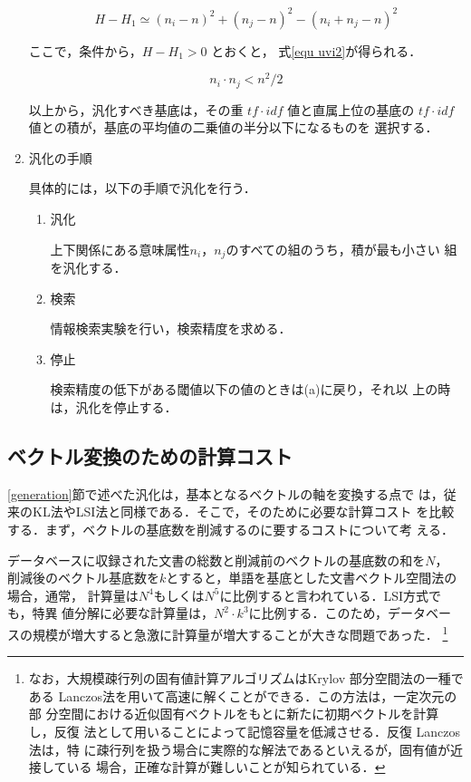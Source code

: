 \begin{enumerate}
\begin{equation}
\label{equ uvi1}
  H - H_1  \simeq (n_i-n)^2 +(n_j-n)^2 -(n_i+n_j-n)^2
\end{equation}

ここで，条件から，$ H - H_1 > 0 $ とおくと，
式\ref{equ uvi2}が得られる．

\begin{equation}
\label{equ uvi2}
     n_i \cdot n_j < n ^2 / 2
\end{equation}

以上から，汎化すべき基底は，その重 $tf \cdot idf$ 値と直属上位の基底の 
$tf \cdot idf$ 値との積が，基底の平均値の二乗値の半分以下になるものを
選択する．

\item 汎化の手順

具体的には，以下の手順で汎化を行う．

\begin{enumerate}

\item 汎化 
\label{itemitem1}

上下関係にある意味属性$ n_i$，$n_j$のすべての組のうち，積が最も小さい
組を汎化する．

\item  検索

情報検索実験を行い，検索精度を求める．

\item 停止

検索精度の低下がある閾値以下の値のときは(a)に戻り，それ以
上の時は，汎化を停止する．

\end{enumerate}


\end{enumerate}

\subsection{ベクトル変換のための計算コスト}

\ref{generation}節で述べた汎化は，基本となるベクトルの軸を変換する点で
は，従来のKL法やLSI法と同様である．そこで，そのために必要な計算コスト
を比較する．まず，ベクトルの基底数を削減するのに要するコストについて考
える．

データベースに収録された文書の総数と削減前のベクトルの基底数の和を$N$，
削減後のベクトル基底数を$k$とすると，単語を基底とした文書ベクトル空間法の場合，通常，
計算量は$N^4$もしくは$N^5$に比例すると言われている．LSI方式でも，特異
値分解に必要な計算量は，$N^2 \cdot k^3$に比例する．このため，データベー
スの規模が増大すると急激に計算量が増大することが大きな問題であった．
\footnote{
なお，大規模疎行列の固有値計算アルゴリズムはKrylov 部分空間法の一種で
ある Lanczos法を用いて高速に解くことができる．この方法は，一定次元の部
分空間における近似固有ベクトルをもとに新たに初期ベクトルを計算し，反復
法として用いることによって記憶容量を低減させる．反復 Lanczos法は，特
に疎行列を扱う場合に実際的な解法であるといえるが，固有値が近接している
場合，正確な計算が難しいことが知られている．}

